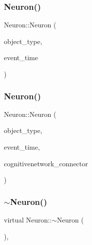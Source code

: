 \subsubsection{\texorpdfstring{Neuron()}{Neuron()}\hspace{0.1cm}{\footnotesize\ttfamily [3/4]}}
{\footnotesize\ttfamily Neuron\+::\+Neuron (\begin{DoxyParamCaption}\item[{unsigned int}]{object\+\_\+type,  }\item[{std\+::chrono\+::time\+\_\+point$<$ \mbox{\hyperlink{universe_8h_a0ef8d951d1ca5ab3cfaf7ab4c7a6fd80}{Clock}} $>$}]{event\+\_\+time }\end{DoxyParamCaption})\hspace{0.3cm}{\ttfamily [inline]}}

\mbox{\label{classNeuron_a6839febd20fb8f776151e00142411a56}} 
\subsubsection{\texorpdfstring{Neuron()}{Neuron()}\hspace{0.1cm}{\footnotesize\ttfamily [4/4]}}
{\footnotesize\ttfamily Neuron\+::\+Neuron (\begin{DoxyParamCaption}\item[{unsigned int}]{object\+\_\+type,  }\item[{std\+::chrono\+::time\+\_\+point$<$ \mbox{\hyperlink{universe_8h_a0ef8d951d1ca5ab3cfaf7ab4c7a6fd80}{Clock}} $>$}]{event\+\_\+time,  }\item[{\mbox{\hyperlink{classCognitiveNetwork}{Cognitive\+Network}} \&}]{cognitivenetwork\+\_\+connector }\end{DoxyParamCaption})\hspace{0.3cm}{\ttfamily [inline]}}

\mbox{\label{classNeuron_aecd41febe74ef417230cd74af0c8b801}} 
\subsubsection{\texorpdfstring{$\sim$\+Neuron()}{~Neuron()}}
{\footnotesize\ttfamily virtual Neuron\+::$\sim$\+Neuron (\begin{DoxyParamCaption}{ }\end{DoxyParamCaption})\hspace{0.3cm}{\ttfamily [inline]}, {\ttfamily [virtual]}}

